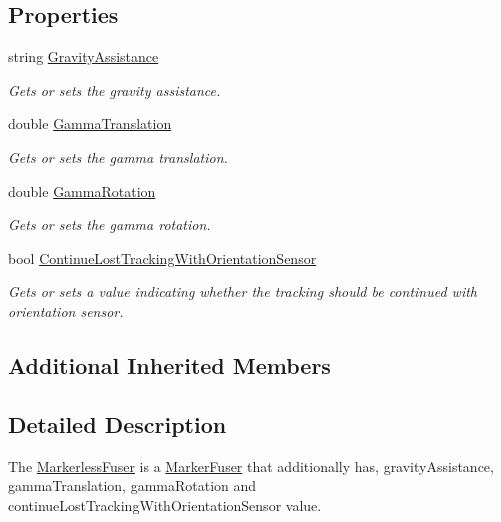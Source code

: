 \subsection*{Properties}
\begin{DoxyCompactItemize}
\item 
string \hyperlink{class_a_rdev_kit_1_1_model_1_1_project_1_1_markerless_fuser_a6a2e22d44700a4d393b8f4e5f0d9a67e}{Gravity\-Assistance}
\begin{DoxyCompactList}\small\item\em Gets or sets the gravity assistance. \end{DoxyCompactList}\item 
double \hyperlink{class_a_rdev_kit_1_1_model_1_1_project_1_1_markerless_fuser_ad092a956a7a5a982d478ec726d0dafe6}{Gamma\-Translation}
\begin{DoxyCompactList}\small\item\em Gets or sets the gamma translation. \end{DoxyCompactList}\item 
double \hyperlink{class_a_rdev_kit_1_1_model_1_1_project_1_1_markerless_fuser_a32b4cbef64b239fe38c7b107158edd85}{Gamma\-Rotation}
\begin{DoxyCompactList}\small\item\em Gets or sets the gamma rotation. \end{DoxyCompactList}\item 
bool \hyperlink{class_a_rdev_kit_1_1_model_1_1_project_1_1_markerless_fuser_a3c2dc4e70445338e8cd8e6f1aefca9c4}{Continue\-Lost\-Tracking\-With\-Orientation\-Sensor}
\begin{DoxyCompactList}\small\item\em Gets or sets a value indicating whether the tracking should be continued with orientation sensor. \end{DoxyCompactList}\end{DoxyCompactItemize}
\subsection*{Additional Inherited Members}


\subsection{Detailed Description}
The \hyperlink{class_a_rdev_kit_1_1_model_1_1_project_1_1_markerless_fuser}{Markerless\-Fuser} is a \hyperlink{class_a_rdev_kit_1_1_model_1_1_project_1_1_marker_fuser}{Marker\-Fuser} that additionally has, gravity\-Assistance, gamma\-Translation, gamma\-Rotation and continue\-Lost\-Tracking\-With\-Orientation\-Sensor value. 

